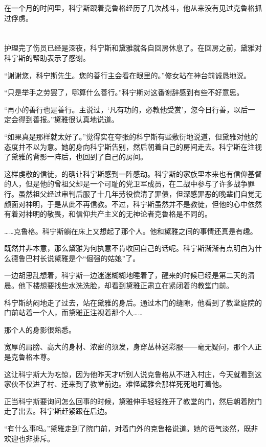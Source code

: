 在一个月的时间里，科宁斯跟着克鲁格经历了几次战斗，他从来没有见过克鲁格抓过俘虏。

\section*{}

护理完了伤员已经是深夜，科宁斯和黛雅就各自回房休息了。在回房之前，黛雅对科宁斯的帮助表示了感谢。

“谢谢您，科宁斯先生。您的善行主会看在眼里的。”修女站在神台前诚恳地说。

“只是举手之劳罢了，哪算什么善行。”科宁斯对这番谢辞感到有些不好意思。

“再小的善行也是善行。主说过，‘凡有功的，必教他受赏’，您今日行善，以后一定会得到善报。”黛雅很认真地说道。

“如果真是那样就太好了。”觉得实在夸张的科宁斯有些敷衍地说道，但黛雅对他的态度并不以为意。她躬身向科宁斯告别，然后朝着自己的房间走去。科宁斯在注视了黛雅的背影一阵后，也回到了自己的房间。

这样虔敬的信徒，的确让科宁斯感到一阵感动。科宁斯的家族里本来也有信仰基督的人，但是他的曾祖父却是一个可耻的党卫军成员，在二战中参与了许多战争罪行。虽然祖父经过审判后服了十几年劳役偿清了罪债，但深感罪恶的晚辈们自觉无颜面对神明，于是从此不再信教。不过，科宁斯虽然并不是教徒，但他的心中依然有着对神明的敬畏，和信仰共产主义的无神论者克鲁格是不同的。

……克鲁格。科宁斯躺在床上又想起了那个人。他和黛雅之间的事情还真是有趣。

既然并非本意，那么黛雅为何执意不肯收回自己的话呢。科宁斯渐渐有点明白为什么德鲁巴村长说黛雅是个“倔强的姑娘”了。

一边胡思乱想着，科宁斯一边迷迷糊糊地睡着了，醒来的时候已经是第二天的清晨。他下楼想要找些水洗洗脸，却看到黛雅正肃立在紧闭着的教堂门前。

科宁斯纳闷地走了过去，站在黛雅的身后。通过木门的缝隙，他看到了教堂庭院的门前站着一个人，而黛雅正注视着那个人……

那个人的身影很熟悉。

宽厚的肩膀、高大的身材、浓密的须发，身穿丛林迷彩服——毫无疑问，那个人正是克鲁格本尊。

这让科宁斯大为吃惊，因为他昨天才听别人说克鲁格从不进入村庄，今天就看到这家伙不仅进了村、还来到了教堂前边。难怪黛雅会那样死死地盯着他。

正当科宁斯要询问怎么回事的时候，黛雅伸手轻轻推开了教堂的门，然后朝着院门走了出去。科宁斯赶紧跟在后边。

“有什么事吗。”黛雅走到了院门前，对着门外的克鲁格说道。她的语气淡然，既非欢迎也非排斥。

